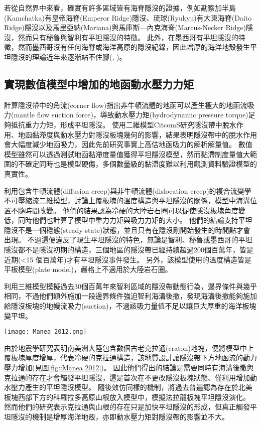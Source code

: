 若從自然界中來看，確實有許多區域皆有海脊隱沒的證據，例如勘察加半島(Kamchatka)有皇帝海脊(Emperor Ridge)隱沒、琉球(Ryukyu)有大東海脊(Daito Ridge)隱沒以及馬里亞納(Mariana)與馬庫斯—內克海脊(Marcus-Necker Ridge)隱沒，然而只有秘魯與智利有平坦隱沒的特徵。
此外，在墨西哥有平坦隱沒的特徵，然而墨西哥沒有任何海脊或海洋高原的隱沒紀錄，因此增厚的海洋地殼發生平坦隱沒的理論近年來逐漸站不住腳(\citealp{schellart2020control}, \citealp{Schellart2021})。

\subsection{實現數值模型中增加的地函動水壓力力矩}
\citealp{tovish1978mantle}計算隱沒帶中的角流(corner flow)指出非牛頓流體的地函可以產生極大的地函流吸力(mantle flow suction force)，導致動水壓力矩(hydrodynamic pressure torque)足夠抵抗重力力矩，形成平坦隱沒。
\citealp{Manea2007}使用二維模型CitcomS研究隱沒帶中脫水作用、地函黏滯度與動水壓力對隱沒板塊幾何的影響，結果表明隱沒帶中的脫水作用會大幅度減少地函吸力，因此先前研究事實上高估地函吸力的解析解量值。
數值模型雖然可以透過測試地函黏滯度量值獲得平坦隱沒模型，然而黏滯制度量值大範圍的不確定同時也是模型硬傷，多個數量級的黏滯度難以利用觀測資料驗證模型的真實性。

\citealp{Thermal2012}利用包含牛頓流體(diffusion creep)與非牛頓流體(dislocation creep)的複合流變學不可壓縮流二維模型，討論上覆板塊的溫度構造與平坦隱沒的關係，模型中海溝位置不隨時間改變。
他們的結果認為冷硬的大陸岩石圈可以促使隱沒板塊角度變低，同時他們也計算了模型中重力力矩與吸力力矩的大小。
他們的結論支持平坦隱沒不是一個穩態(steady-state)狀態，並且只有在隱沒剛開始發生的時間點才會出現。
不過這便違反了現生平坦隱沒的特色，無論是智利、秘魯或墨西哥的平坦隱沒都不是隱沒初期的構造，三個地區的隱沒帶已經持續超過200個百萬年，皆是近期(<15 個百萬年)才有平坦隱沒事件發生。
另外，該模型使用的溫度構造皆是平板模型(plate model)，嚴格上不適用於大陸岩石圈。

\citealp{Manea2012Chile}利用三維模型模擬過去30個百萬年來智利區域的隱沒帶動態行為，邊界條件與\citealp{Thermal2012}幾乎相同，不過他們額外施加一段邊界條件強迫智利海溝後撤，發現海溝後撤能夠施加給隱沒板塊的地幔流吸力(suction)，不過該吸力量值不足以讓巨大厚重的海洋板塊變平坦。
\begin{figure*}[ht!]
    \centering
    \texttt{[image: Manea 2012.png]}
    \caption{\citealp{Manea2012Chile}中的智利平坦隱沒模型，模型中同時加入海溝後撤與增厚大陸岩石圈可以讓平坦隱沒發育。
    }
    \label{fig::Manea 2012}
\end{figure*}
由於地震學研究表明南美洲大陸包含數個古老克拉通(craton)地塊，\citealp{Manea2012Chile}便將模型中上覆板塊厚度增厚，代表冷硬的克拉通構造，該地質設計讓隱沒帶下方地函流的動力壓力增加(見圖\ref{fig::Manea 2012})。
因此他們得出的結論是需要同時有海溝後撤與克拉通的存在才會觸發平坦隱沒，這是首次在不更改隱沒板塊狀態、僅利用增加動水壓力產生的平坦隱沒模型。
隨後\citealp{Liu2016}效仿同樣的機制，將過去普遍認為存在於北美板塊西部下方的科羅拉多高原山根放入模型中，模擬法拉龍板塊平坦隱沒演化。
然而他們的研究表示克拉通與山根的存在只是加快平坦隱沒的形成，但真正觸發平坦隱沒的機制是增厚海洋地殼，亦即動水壓力矩對隱沒帶的影響並不大。

